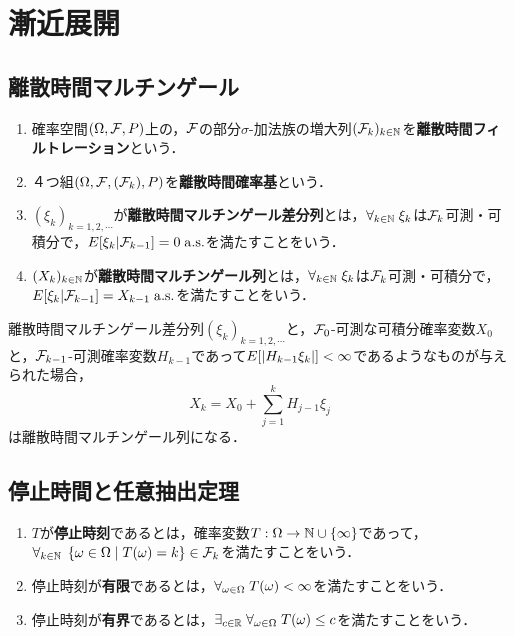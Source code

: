 \documentclass[uplatex,dvipdfmx]{jsreport}
\begin{document}
\chapter{漸近展開}

\section{離散時間マルチンゲール}

\begin{definition}[filtration]\mbox{}
    \begin{enumerate}
        \item 確率空間$(\Omega,\mathcal{F},P)$上の，$\mathcal{F}$の部分$\sigma$-加法族の増大列$(\mathcal{F}_k)_{k\in\mathbb{N}}$を\textbf{離散時間フィルトレーション}という．
        \item ４つ組$(\Omega,\mathcal{F},(\mathcal{F}_k),P)$を\textbf{離散時間確率基}という．
        \item $(\xi_k)_{k=1,2,\cdots}$が\textbf{離散時間マルチンゲール差分列}とは，$\forall_{k\in\mathbb{N}}\;\xi_k$は$\mathcal{F}_k$可測・可積分で，$E[\xi_k|\mathcal{F}_{k-1}]=0\;\mathrm{a.s.}$を満たすことをいう．
        \item $(X_k)_{k\in\mathbb{N}}$が\textbf{離散時間マルチンゲール列}とは，$\forall_{k\in\mathbb{N}}\;\xi_k$は$\mathcal{F}_k$可測・可積分で，$E[\xi_k|\mathcal{F}_{k-1}]=X_{k-1}\;\mathrm{a.s.}$を満たすことをいう．
    \end{enumerate}
\end{definition}

\begin{lemma}
    離散時間マルチンゲール差分列$(\xi_k)_{k=1,2,\cdots}$と，$\mathcal{F}_0$-可測な可積分確率変数$X_0$と，$\mathcal{F}_{k-1}$-可測確率変数$H_{k-1}$であって$E[\lvert H_{k-1}\xi_k\rvert]<\infty$であるようなものが与えられた場合，
    \[X_k=X_0+\sum^k_{j=1}H_{j-1}\xi_j\]
    は離散時間マルチンゲール列になる．
\end{lemma}

\section{停止時間と任意抽出定理}

\begin{definition}\mbox{}
    \begin{enumerate}
        \item $T$が\textbf{停止時刻}であるとは，確率変数$T:\Omega\to\mathbb{N}\cup\{\infty\}$であって，$\forall_{k\in\mathbb{N}}\;\left\{\omega\in\Omega\mid T(\omega)=k\right\}\in\mathcal{F}_k$を満たすことをいう．
        \item 停止時刻が\textbf{有限}であるとは，$\forall_{\omega\in\Omega}\;T(\omega)<\infty$を満たすことをいう．
        \item 停止時刻が\textbf{有界}であるとは，$\exists_{c\in\mathbb{R}}\;\forall_{\omega\in\Omega}\;T(\omega)\le c$を満たすことをいう．
    \end{enumerate}
\end{definition}
\end{document}
